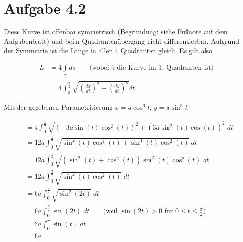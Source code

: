 \documentclass[a4paper,german,12pt,smallheadings]{scrartcl}
\begin{document}
\section*{Aufgabe 4.2}

Diese Kurve ist offenbar symmetrisch (Begründung: siehe Fußnote auf dem
Aufgabenblatt) und beim Quadrantenübergang nicht differenzierbar. Aufgrund der
Symmetrie ist die Länge in allen 4 Quadranten gleich. Es gilt also

\begin{align*}
  L &= 4 \int\limits_{\overline{\gamma}}  ds \qquad \text{(wobei }\overline{\gamma}\text{ die Kurve im 1. Quadranten ist)} \\
    &= 4 \int_0^{\frac{\pi}{2}} \sqrt{\left(\frac{dx}{dt}\right)^2 + \left(\frac{dy}{dt}\right)^2} dt
\end{align*}

Mit der gegebenen Parametrisierung $x=a \cos^3 t$, $y = a \sin^3 t$:

\begin{align*}
  &= 4 \int_0^{\frac{\pi}{2}}   \sqrt{\left(-3a \sin(t) \cos^2(t) \right)^2 + \left(3a \sin^2(t) \cos(t)\right)^2} \; dt \\
  &= 12a \int_0^{\frac{\pi}{2}} \sqrt{\sin^2(t) \cos^4(t) + \sin^4(t) \cos^2(t)} \; dt \\
  &= 12a \int_0^{\frac{\pi}{2}} \sqrt{(\sin^2(t) + \cos^2(t)) \sin^2(t)\cos^2(t)} \; dt \\
  &= 12a \int_0^{\frac{\pi}{2}} \sqrt{\sin^2(t)\cos^2(t)} \; dt \\
  &= 6a \int_0^{\frac{\pi}{2}}  \sqrt{\sin^2(2t)} \; dt \\
  &= 6a \int_0^{\frac{\pi}{2}}  \sin(2t) \; dt \qquad \text{(weil $\sin(2t) > 0$ für $0 \le t \le \frac{\pi}{2}$)} \\
  &= 3a \int_0^{\pi}            \sin(t) \; dt \\
  &= 6a
\end{align*}


\begin{equation*}
\end{equation*}
\end{document}
